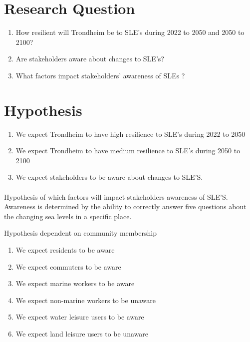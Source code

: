 \section{Research Question}
\begin{enumerate}
    \item How resilient will Trondheim be to SLE’s during 2022 to 2050 and 2050 to 2100?
    \item Are stakeholders aware about changes to SLE’s?
    \item What factors impact stakeholders’ awareness of SLEs ?
\end{enumerate}

\section{Hypothesis}
\begin{enumerate}
    \item We expect Trondheim to have high resilience to SLE's during 2022 to 2050
    \item We expect Trondheim to have medium resilience to SLE's during 2050 to 2100
    \item We expect stakeholders to be aware about changes to SLE'S.
\end{enumerate}
\paragraph{}
Hypothesis of which factors will impact stakeholders awareness of SLE'S.
Awareness is determined by the ability to correctly answer five questions about the changing sea levels in a specific place.

Hypothesis dependent on community membership
\begin{enumerate}
    \item We expect residents to be aware
    \item We expect commuters to be aware
    \item We expect marine workers to be aware
    \item We expect non-marine workers to be unaware
    \item We expect water leisure users to be aware
    \item We expect land leisure users to be unaware
    \end{enumerate}
\paragraph{}

